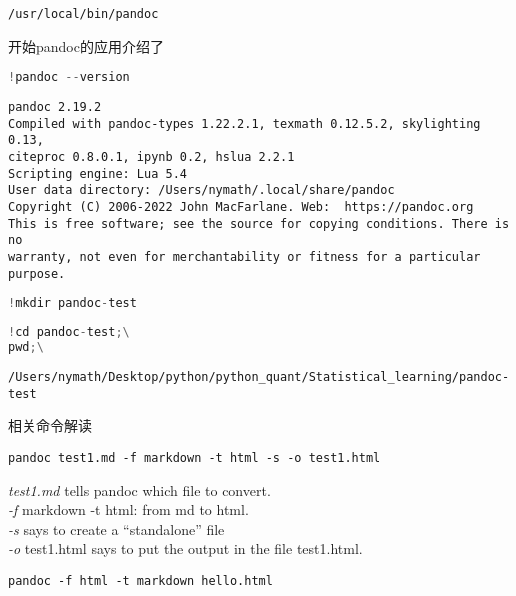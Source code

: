 \documentclass[
]{article}
\begin{document}
\begin{lstlisting}
/usr/local/bin/pandoc
\end{lstlisting}

\leavevmode{}%
开始pandoc的应用介绍了

\hypertarget{de037974}{}
\begin{lstlisting}[language=Python]
!pandoc --version
\end{lstlisting}

\begin{lstlisting}
pandoc 2.19.2
Compiled with pandoc-types 1.22.2.1, texmath 0.12.5.2, skylighting 0.13,
citeproc 0.8.0.1, ipynb 0.2, hslua 2.2.1
Scripting engine: Lua 5.4
User data directory: /Users/nymath/.local/share/pandoc
Copyright (C) 2006-2022 John MacFarlane. Web:  https://pandoc.org
This is free software; see the source for copying conditions. There is no
warranty, not even for merchantability or fitness for a particular purpose.
\end{lstlisting}

\hypertarget{6eb2a15a}{}
\begin{lstlisting}[language=Python]
!mkdir pandoc-test
\end{lstlisting}

\hypertarget{e3721cb3}{}
\begin{lstlisting}[language=Python]
!cd pandoc-test;\
pwd;\
\end{lstlisting}

\begin{lstlisting}
/Users/nymath/Desktop/python/python_quant/Statistical_learning/pandoc-test
\end{lstlisting}

\leavevmode{}%
相关命令解读

\begin{lstlisting}
pandoc test1.md -f markdown -t html -s -o test1.html
\end{lstlisting}

\emph{test1.md} tells pandoc which file to convert.\\
\emph{-f} markdown -t html: from md to html.\\
\emph{-s} says to create a ``standalone'' file\\
\emph{-o} test1.html says to put the output in the file test1.html.

\hypertarget{e9f2141a}{}
\begin{lstlisting}
pandoc -f html -t markdown hello.html
\end{lstlisting}
\end{document}
